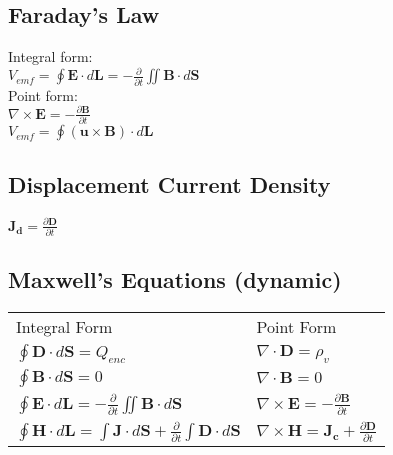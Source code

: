 \documentclass[12pt]{exam}
\begin{document}
\begin{multicols}{2}
\begin{flushleft}
\normalsize
\vspace{0.2in}
\subsection*{Faraday's Law}
{ \addtolength{\leftskip}{0.5in}
	Integral form: \\
	\quad$V_{emf}=\oint \mathbf{E} \cdot d\mathbf{L} = -\frac{\partial}{\partial t}\iint \mathbf{B}\cdot d\mathbf{S}$ \\[6pt]
	Point form:\\
	\quad $\nabla \times \mathbf{E} =-\frac{\partial \mathbf{B}}{\partial t}$ \\[12pt]
	$V_{emf} = \oint(\mathbf{u}\times\mathbf{B})\cdot d\mathbf{L} $ \\
}

\normalsize
\vspace{0.2in}
\subsection*{Displacement Current Density}
{ \addtolength{\leftskip}{0.5in}
	$\mathbf{J_d} = \frac{\partial\mathbf{D}}{\partial t} $ \\
}

\hfill \vfil	
\columnbreak
\normalsize
\vspace{0.2in}
\subsection*{Maxwell's Equations (dynamic)}
{
	\begin{tabular}{l l}
		Integral Form & Point Form \\ [4 pt]
		$\oint\mathbf{D}\cdot d\mathbf{S} = Q_{enc}$ & $\nabla\cdot\mathbf{D} = \rho_v$  \\[4 pt]
		$\oint\mathbf{B}\cdot d\mathbf{S} = 0$ &  $\nabla\cdot\mathbf{B} = 0$ \\[4 pt]
		$\oint\mathbf{E}\cdot d\mathbf{L} = -\frac{\partial}{\partial t}\iint \mathbf{B}\cdot d\mathbf{S}$ &  $\nabla\times\mathbf{E} = -\frac{\partial\mathbf{B}}{\partial t}$ \\[4 pt]
		$\oint\mathbf{H}\cdot d\mathbf{L} = \int\mathbf{J}\cdot d\mathbf{S} + \frac{\partial}{\partial t}\int\mathbf{D}\cdot d\mathbf{S}$ &  $\nabla\times\mathbf{H} = \mathbf{J_c}+\frac{\partial\mathbf{D}}{\partial t} $ \\[4 pt]
	\end{tabular}
}
	
	
\end{flushleft}
\end{multicols}
\end{document}
